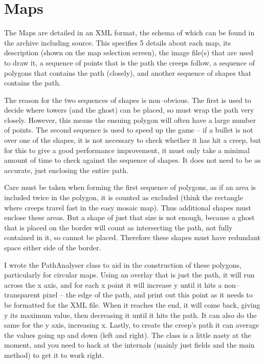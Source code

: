 \documentclass[a4paper,11pt]{article}
\begin{document}
\section{Maps}
The Maps are detailed in an XML format, the schema of which can be found in the archive including source. This specifies 5 details about each map, its description (shown on the map selection screen), the image file(s) that are used to draw it, a sequence of points that is the path the creeps follow, a sequence of polygons that contains the path (closely), and another sequence of shapes that contains the path.

The reason for the two sequences of shapes is non--obvious. The first is used to decide where towers (and the ghost) can be placed, so must wrap the path very closely. However, this means the ensuing polygon will often have a large number of points. The second sequence is used to speed up the game -- if a bullet is not over one of the shapes, it is not necessary to check whether it has hit a creep, but for this to give a good performance improvement, it must only take a minimal amount of time to check against the sequence of shapes. It does not need to be as accurate, just enclosing the entire path.

Care must be taken when forming the first sequence of polygons, as if an area is included twice in the polygon, it is counted as excluded (think the rectangle where creeps travel fast in the easy mosaic map). Thus additional shapes must enclose these areas. But a shape of just that size is not enough, because a ghost that is placed on the border will count as intersecting the path, not fully contained in it, so cannot be placed. Therefore these shapes must have redundant space either side of the border.

I wrote the PathAnalyser class to aid in the construction of these polygons, particularly for circular maps. Using an overlay that is just the path, it will run across the x axis, and for each x point it will increase y until it hits a non--transparent pixel -- the edge of the path, and print out this point as it needs to be formatted for the XML file. When it reaches the end, it will come back, giving y its maximum value, then decreasing it until it hits the path. It can also do the same for the y axis, increasing x. Lastly, to create the creep's path it can average the values going up and down (left and right). The class is a little nasty at the moment, and you need to hack at the internals (mainly just fields and the main method) to get it to work right.
\end{document}
